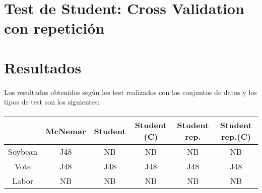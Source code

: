 \documentclass[10pt, a4paper,spanish]{article}
\begin{document}
        \paragraph{}

	\section{Test de Student: Cross Validation con repetición}

	        \paragraph{}
	\section{Resultados}

		\paragraph{}
		Los resultados obtenidos según los test realizados con los conjuntos de datos y los tipos de test son los siguientes:

		\paragraph{}
		\begin{center}
			\begin{tabular}{ | c || c | c | c | c | c | }
				\hline
				 			& McNemar	& Student	& Student (C) 	& Student rep. 	& Student rep.(C) 	\\ \hline \hline
				Soybean 	& J48 		& NB		& NB			& NB			& NB			 	\\ \hline
				Vote 		& J48 		& J48		& J48			& J48			& J48				\\ \hline
				Labor 		& NB 		& NB		& NB			& NB			& NB				\\
				\hline
			\end{tabular}
		\end{center}
\end{document}
